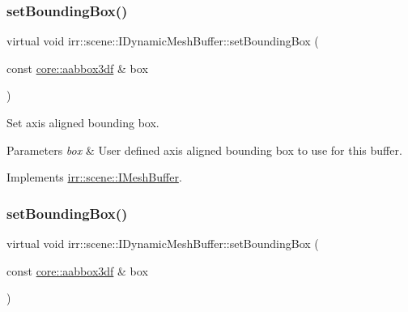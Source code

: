 \subsubsection{\texorpdfstring{set\+Bounding\+Box()}{setBoundingBox()}\hspace{0.1cm}{\footnotesize\ttfamily [1/2]}}
{\footnotesize\ttfamily virtual void irr\+::scene\+::\+I\+Dynamic\+Mesh\+Buffer\+::set\+Bounding\+Box (\begin{DoxyParamCaption}\item[{const \hyperlink{namespaceirr_1_1core_a60f4b4c744aba55f10530d503c6ecb04}{core\+::aabbox3df} \&}]{box }\end{DoxyParamCaption})\hspace{0.3cm}{\ttfamily [pure virtual]}}



Set axis aligned bounding box. 


\begin{DoxyParams}{Parameters}
{\em box} & User defined axis aligned bounding box to use for this buffer. \\
\hline
\end{DoxyParams}


Implements \hyperlink{classirr_1_1scene_1_1IMeshBuffer_adbbfb7757dfbba7357193d2280893df6}{irr\+::scene\+::\+I\+Mesh\+Buffer}.

\mbox{\label{classirr_1_1scene_1_1IDynamicMeshBuffer_adbe127e3774de6ae7ce96cb534a336e5}} 
\subsubsection{\texorpdfstring{set\+Bounding\+Box()}{setBoundingBox()}\hspace{0.1cm}{\footnotesize\ttfamily [2/2]}}
{\footnotesize\ttfamily virtual void irr\+::scene\+::\+I\+Dynamic\+Mesh\+Buffer\+::set\+Bounding\+Box (\begin{DoxyParamCaption}\item[{const \hyperlink{namespaceirr_1_1core_a60f4b4c744aba55f10530d503c6ecb04}{core\+::aabbox3df} \&}]{box }\end{DoxyParamCaption})\hspace{0.3cm}{\ttfamily [pure virtual]}}



